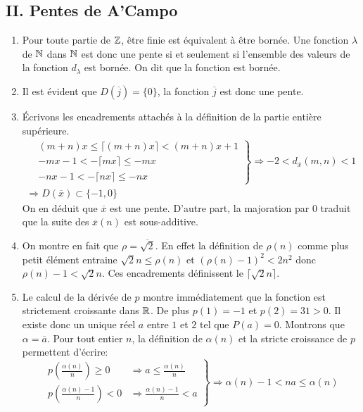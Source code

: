 \subsection*{II. Pentes de A'Campo}
\begin{enumerate}
 \item Pour toute partie de $\mathbb{Z}$, être finie est équivalent à être bornée. Une fonction $\lambda$ de $\mathbb{N}$ dans $\mathbb{N}$ est donc une pente si et seulement si l'ensemble des valeurs de la fonction $d_\lambda$ est bornée. On dit que la fonction est bornée.
 \item Il est évident que $D(\overline{j})=\{0\}$, la fonction $\overline{j}$ est donc une pente.
 \item \'Ecrivons les encadrements attachés à la définition de la \og partie entière supérieure\fg.
\begin{multline*}
\left.  
\begin{aligned}
  &(m+n)x \leq \lceil (m+n)x \rceil < (m+n)x + 1\\
 & -mx -1 < -\lceil mx \rceil \leq - mx \\
 & -nx -1 < -\lceil nx \rceil \leq - nx
 \end{aligned}
\right\rbrace
\Rightarrow
 -2 < d_{\overline{x}}(m,n)<1 \\
\Rightarrow D(\overline{x})\subset \{-1,0\}
\end{multline*}
On en déduit que $\overline{x}$ est une pente. D'autre part, la majoration par $0$ traduit que la suite des $\overline{x}(n)$ est sous-additive.
 \item On montre en fait que $\rho = \overline{\sqrt{2}}$. En effet la définition de $\rho(n)$ comme plus petit élément entraine $\sqrt{2}n\leq \rho(n)$ et $(\rho(n)-1)^2<2n^2$ donc $\rho(n)-1 < \sqrt{2}n$. Ces encadrements définissent le $\lceil\sqrt{2}n\rceil$.

 \item Le calcul de la dérivée de $p$ montre immédiatement que la fonction est strictement croissante dans $\mathbb{R}$. De plus $p(1)=-1$ et $p(2)=31>0$. Il existe donc un unique réel $a$ entre $1$ et $2$ tel que $P(a)=0$. Montrons que $\alpha = \overline{a}$.\newline
Pour tout entier $n$, la définition de $\alpha(n)$ et la stricte croissance de $p$ permettent d'écrire:
\begin{displaymath}
\left. 
\begin{aligned}
 p(\frac{\alpha(n)}{n})\geq 0 &\Rightarrow a\leq \frac{\alpha(n)}{n}\\
 p(\frac{\alpha(n)-1}{n})< 0 &\Rightarrow \frac{\alpha(n)-1}{n}<a
\end{aligned}
\right\rbrace 
\Rightarrow
 \alpha(n)-1 < na \leq \alpha(n)
\end{displaymath}
\end{enumerate}

